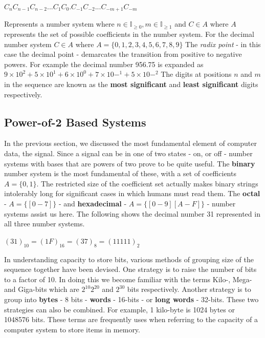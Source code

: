 \documentclass[10pt,a4paper]{article}
\begin{document}
\begin{center}
$C_{n} C_{n-1} C_{n-2}...C_{1} C_{0}.C_{-1} C_{-2}...C_{-m+1} C_{-m}$
\end{center}
Represents a number system where $n \in \mathbb{I}_{\geq0}, m \in \mathbb{I}_{\geq1}$ and $C \in A$ where $A$ represents the set of possible coefficients in the number system. For the decimal number system $C \in A$ where $A = \{0,1,2,3,4,5,6,7,8,9\}$
\newline\newline
The {\it radix point} - in this case the decimal point - demarcates the transition from positive to negative powers. For example the decimal number 956.75 is expanded as 
$9\times10^2 + 5\times10^1 + 6\times10^0 + 7\times10-^1 + 5\times10-^2$
\newline\newline
The digits at positions $n$ and $m$ in the sequence are known as the {\bf most significant} and {\bf least significant} digits respectively. 
\subsection{Power-of-2 Based Systems}
In the previous section, we discussed the most fundamental element of computer data, the signal. Since a signal can be in one of two states - on, or off - number systems with bases that are powers of two prove to be quite useful. The {\bf binary} number system is the most fundamental of these, with a set of coefficients $A = \{0,1\}$. The restricted size of the coefficient set actually makes binary strings intolerably long for significant cases in which humans must read them. The {\bf octal} - $A= \{[0 - 7]\}$ - and {\bf hexadecimal} - $A = \{[0-9][A-F]\}$ - number systems assist us here. The following shows the decimal number 31 represented in all three number systems. 
\begin{center}
$(31)_{10} = (1F)_{16} = (37)_8 = (11111)_2$
\end{center} 
In understanding capacity to store bits, various methods of grouping size of the sequence together have been devised. One strategy is to raise the number of bits to a factor of 10. In doing this we become familiar with the terms Kilo-, Mega- and Giga-bits which are $2^{10} 2^{20}$ and $2^{30}$ bits respectively.  Another strategy is to group into {\bf bytes} - 8 bits - {\bf words} - 16-bits - or {\bf long words} - 32-bits. These two strategies can also be combined. For example, 1 kilo-byte is 1024 bytes or 1048576 bits. These terms are frequently uses when referring to the capacity of a computer system to store items in memory. 
\end{document}
